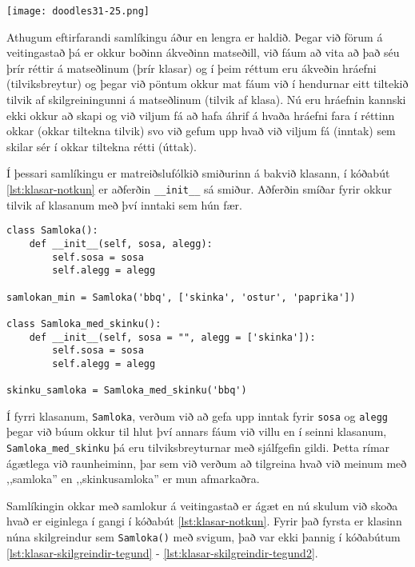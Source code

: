 \phantom{easter egg}
\begin{center}
	\texttt{[image: doodles31-25.png]}
\end{center}

Athugum eftirfarandi samlíkingu áður en lengra er haldið.
Þegar við förum á veitingastað þá er okkur boðinn ákveðinn matseðill, við fáum að vita að það séu þrír réttir á matseðlinum (þrír klasar) og í þeim réttum eru ákveðin hráefni (tilviksbreytur) og þegar við pöntum okkur mat fáum við í hendurnar eitt tiltekið tilvik af skilgreiningunni á matseðlinum (tilvik af klasa).
Nú eru hráefnin kannski ekki okkur að skapi og við viljum fá að hafa áhrif á hvaða hráefni fara í réttinn okkar (okkar tiltekna tilvik) svo við gefum upp hvað við viljum fá (inntak) sem skilar sér í okkar tiltekna rétti (úttak).

Í þessari samlíkingu er matreiðslufólkið smiðurinn á bakvið klasann, í kóðabút \ref{lst:klasar-notkun} er aðferðin \texttt{\_\_init\_\_} sá smiður.
Aðferðin smíðar fyrir okkur tilvik af klasanum með því inntaki sem hún fær.

\begin{lstlisting}[caption=Klasar skilgreindir með töfraaðferðinni \_\_init\_\_, label=lst:klasar-notkun]
class Samloka():
	def __init__(self, sosa, alegg):
		self.sosa = sosa
		self.alegg = alegg
		
samlokan_min = Samloka('bbq', ['skinka', 'ostur', 'paprika'])

class Samloka_med_skinku():
	def __init__(self, sosa = "", alegg = ['skinka']):
		self.sosa = sosa
		self.alegg = alegg
		
skinku_samloka = Samloka_med_skinku('bbq')
\end{lstlisting}

Í fyrri klasanum, \texttt{Samloka}, verðum við að gefa upp inntak fyrir \texttt{sosa} og \texttt{alegg} þegar við búum okkur til hlut því annars fáum við villu en í seinni klasanum, \texttt{Samloka\_med\_skinku} þá eru tilviksbreyturnar með sjálfgefin gildi.
Þetta rímar ágætlega við raunheiminn, þar sem við verðum að tilgreina hvað við meinum með ,,samloka'' en ,,skinkusamloka'' er mun afmarkaðra.

Samlíkingin okkar með samlokur á veitingastað er ágæt en nú skulum við skoða hvað er eiginlega í gangi í kóðabút \ref{lst:klasar-notkun}.
Fyrir það fyrsta er klasinn núna skilgreindur sem \texttt{Samloka()} með svigum, það var ekki þannig í kóðabútum \ref{lst:klasar-skilgreindir-tegund} - \ref{lst:klasar-skilgreindir-tegund2}.

